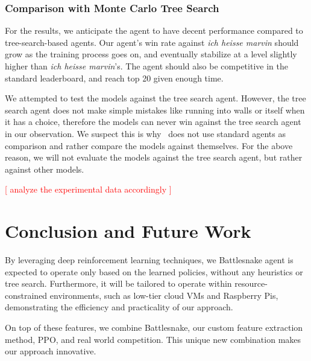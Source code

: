 \documentclass[conference]{IEEEtran}
\newcommand{\todo}[1]{\textcolor{red}{[ #1 ]}}
\begin{document}
\subsubsection{Comparison with Monte Carlo Tree Search}

For the results,
we anticipate the agent to have decent performance compared to tree-search-based
agents. Our agent's win rate against \emph{ich heisse marvin}
should grow as the training process goes on,
and eventually stabilize at a level slightly higher than \emph{ich heisse
marvin}'s. The agent should also be competitive in the standard leaderboard,
and reach top 20 given enough time.

We attempted to test the models against the tree search agent. However,
the tree search agent does not make simple mistakes like running into walls or
itself when it has a choice,
therefore the models can never win against the tree search agent in our
observation. We suspect this is why~\cite{chung2020battlesnake}
does not use standard agents as comparison and rather compare the models against
themselves. For the above reason,
we will not evaluate the models against the tree search agent,
but rather against other models.

\todo{analyze the experimental data accordingly}

\section{Conclusion and Future Work}

By leveraging deep reinforcement learning techniques,
we Battlesnake agent is expected to operate only based on the learned policies,
without any heuristics or tree search.
Furthermore, it will be tailored to operate within resource-constrained
environments, such as low-tier cloud VMs and Raspberry Pis,
demonstrating the efficiency and practicality of our approach.

On top of these features, we combine Battlesnake,
our custom feature extraction method, PPO, and real world competition.
This unique new combination makes our approach innovative.

\printbibliography
\end{document}

